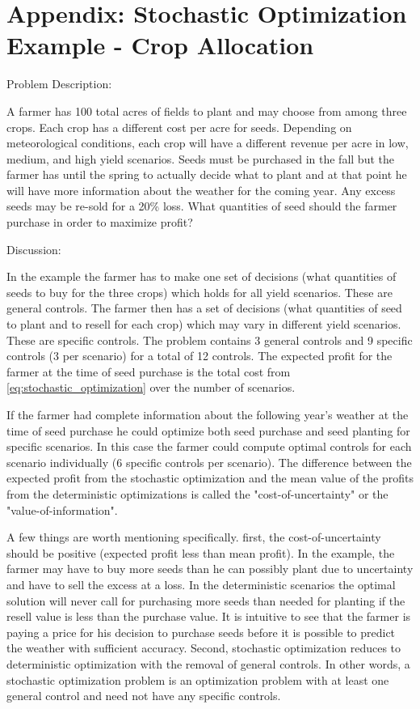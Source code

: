\documentclass[12pt]{article}
\begin{document}
\appendix

\section*{Appendix: Stochastic Optimization Example - Crop Allocation}

\noindent Problem Description:

\medskip

A farmer has 100 total acres of fields to plant and may choose from among three crops. Each crop has a different cost per acre for seeds. Depending on meteorological conditions, each crop will have a different revenue per acre in  low, medium, and high yield scenarios. Seeds must be purchased in the fall but the farmer has until the spring to actually decide what to plant and at that point he will have more information about the weather for the coming year. Any excess seeds may be re-sold for a 20\% loss. What quantities of seed should the farmer purchase in order to maximize profit?

\medskip

\noindent Discussion:

\medskip

In the example the farmer has to make one set of decisions (what quantities of seeds to buy for the three crops) which holds for all yield scenarios. These are general controls. The farmer then has a set of decisions (what quantities of seed to plant and to resell for each crop) which may vary in different yield scenarios. These are specific controls. The problem contains 3 general controls and 9 specific controls (3 per scenario) for a total of 12 controls. The expected profit for the farmer at the time of seed purchase is the total cost from \eqref{eq:stochastic_optimization} over the number of scenarios.

If the farmer had complete information about the following year's weather at the time of seed purchase he could optimize both seed purchase and seed planting for specific scenarios. In this case the farmer could compute optimal controls for each scenario individually (6 specific controls per scenario). The difference between the expected profit from the stochastic optimization and the mean value of the profits from the deterministic optimizations is called the "cost-of-uncertainty" or the "value-of-information".

A few things are worth mentioning specifically. first, the cost-of-uncertainty should be positive (expected profit less than mean profit). In the example, the farmer may have to buy more seeds than he can possibly plant due to uncertainty and have to sell the excess at a loss. In the deterministic scenarios the optimal solution will never call for purchasing more seeds than needed for planting if the resell value is less than the purchase value. It is intuitive to see that the farmer is paying a price for his decision to purchase seeds before it is possible to predict the weather with sufficient accuracy. Second, stochastic optimization reduces to deterministic optimization with the removal of general controls. In other words, a stochastic optimization problem is an optimization problem with at least one general control and need not have any specific controls.
	
\end{document}
